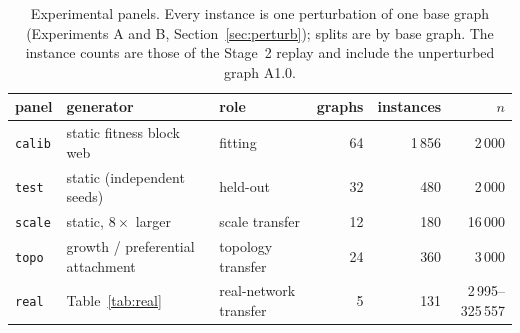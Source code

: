 \begin{table}[t]
\centering
\small
\caption{Experimental panels. Every instance is one perturbation of one base graph (Experiments A and B, Section~\ref{sec:perturb}); splits are by base graph. The instance counts are those of the Stage~2 replay and include the unperturbed graph A1.0.}
\label{tab:panels}
\begin{tabular}{@{}lllrrr@{}}
\toprule
panel & generator & role & graphs & instances & $n$ \\
\midrule
\texttt{calib} & static fitness block web & fitting & 64 & 1\,856 & 2\,000 \\
\texttt{test} & static (independent seeds) & held-out & 32 & 480 & 2\,000 \\
\texttt{scale} & static, $8\times$ larger & scale transfer & 12 & 180 & 16\,000 \\
\texttt{topo} & growth / preferential attachment & topology transfer & 24 & 360 & 3\,000 \\
\texttt{real} & Table~\ref{tab:real} & real-network transfer & 5 & 131 & 2\,995--325\,557 \\
\bottomrule
\end{tabular}
\end{table}
